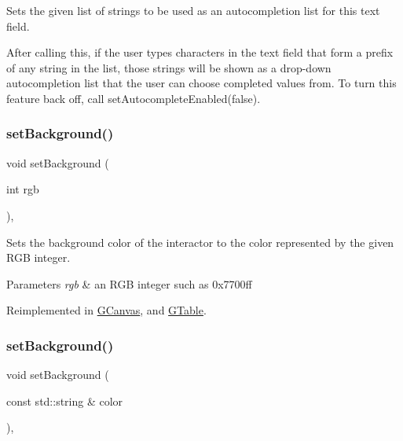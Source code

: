 Sets the given list of strings to be used as an autocompletion list for this text field. 

After calling this, if the user types characters in the text field that form a prefix of any string in the list, those strings will be shown as a drop-\/down autocompletion list that the user can choose completed values from. To turn this feature back off, call set\+Autocomplete\+Enabled(false). \mbox{\label{classsgl_1_1GInteractor_acba7e546c2025c0a15ca4b4cc92043db}} 
\subsubsection{\texorpdfstring{set\+Background()}{setBackground()}\hspace{0.1cm}{\footnotesize\ttfamily [1/2]}}
{\footnotesize\ttfamily void set\+Background (\begin{DoxyParamCaption}\item[{int}]{rgb }\end{DoxyParamCaption})\hspace{0.3cm}{\ttfamily [virtual]}, {\ttfamily [inherited]}}



Sets the background color of the interactor to the color represented by the given R\+GB integer. 


\begin{DoxyParams}{Parameters}
{\em rgb} & an R\+GB integer such as 0x7700ff \\
\hline
\end{DoxyParams}


Reimplemented in \mbox{\hyperlink{classsgl_1_1GCanvas_a10d305826534b55561ea88730fc9f6cd}{G\+Canvas}}, and \mbox{\hyperlink{classsgl_1_1GTable_aefbd30fa3e699d49b6dd2c2a2d6e8c2b}{G\+Table}}.

\mbox{\label{classsgl_1_1GInteractor_ab4677ab2474e68b07aa56605af92a84a}} 
\subsubsection{\texorpdfstring{set\+Background()}{setBackground()}\hspace{0.1cm}{\footnotesize\ttfamily [2/2]}}
{\footnotesize\ttfamily void set\+Background (\begin{DoxyParamCaption}\item[{const std\+::string \&}]{color }\end{DoxyParamCaption})\hspace{0.3cm}{\ttfamily [virtual]}, {\ttfamily [inherited]}}



